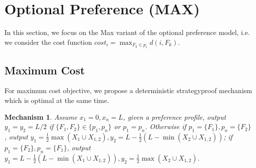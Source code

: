\documentclass[twoside,11pt]{article}
\newtheorem{mechanism}{Mechanism}
\begin{document}
\section{Optional Preference (MAX)}\label{sec-max}
In this section, we focus on the Max variant of the optional preference model, i.e. we consider the cost function $cost_{i} = \max_{F_{k} \in p_{i}} d (i, F_{k})$.
\subsection{Maximum Cost}
\label{sec-max-max}
For maximum cost objective, we propose a deterministic strategyproof mechanism which is optimal at the same time.
\begin{mechanism}
Assume $x_1 = 0,x_n = L$, given a preference profile, output $y_1 = y_2 = L/2$ if $\{F_{1}, F_{2}\} \in \{p_{1}, p_{n}\}$ or $p_{1} = p_{n}$. Otherwise if $p_{1} = \{F_{1}\}, p_{n}=\{F_{2}\}$, output $y_1 = \frac{1}{2} \max (X_{1} \cup X_{1,2}), y_2 = L- \frac{1}{2} (L - \min (X_{2} \cup X_{1,2}))$; if $p_{1} = \{F_{2}\}, p_{n}=\{F_{1}\}$, output $y_1= L - \frac{1}{2} (L - \min (X_{1} \cup X_{1,2})), y_2 = \frac{1}{2} \max (X_{2} \cup X_{1,2})$.
\end{mechanism}
\end{document}
